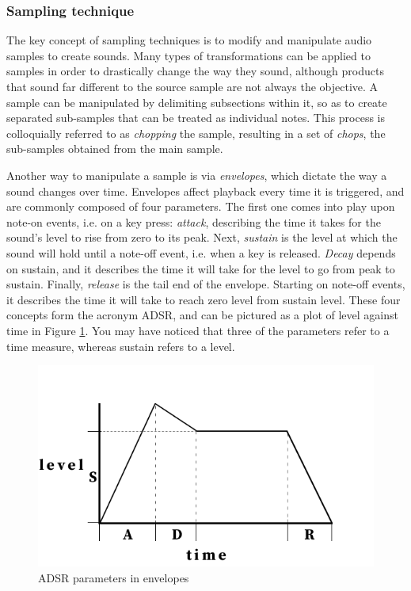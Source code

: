 \documentclass[12pt, a4paper, hidelinks]{article}
\begin{document}
	\subsubsection{Sampling technique}
	The key concept of sampling techniques is to modify and manipulate audio samples to create sounds. Many types of transformations can be applied to samples in order to drastically change the way they sound, although products that sound far different to the source sample are not always the objective. A sample can be manipulated by delimiting subsections within it, so as to create separated sub-samples that can be treated as individual notes. This process is colloquially referred to as \textit{chopping} the sample, resulting in a set of \textit{chops}, the sub-samples obtained from the main sample. \par
	Another way to manipulate a sample is via \textit{envelopes}, which dictate the way a sound changes over time. Envelopes affect playback every time it is triggered, and are commonly composed of four parameters. The first one  comes into play upon note-on events, i.e. on a key press: \textit{attack}, describing the time it takes for the sound's level to rise from zero to its peak. Next, \textit{sustain} is the level at which the sound will hold until a note-off event, i.e. when a key is released. \textit{Decay} depends on sustain, and it describes the time it will take for the level to go from peak to sustain. Finally, \textit{release} is the tail end of the envelope. Starting on note-off events, it describes the time it will take to reach zero level from sustain level. These four concepts form the acronym ADSR, and can be pictured as a plot of level against time in Figure \ref{fig:envelope}. You may have noticed that three of the parameters refer to a time measure, whereas sustain refers to a level. \par
	
	
	\begin{figure}[h]
		\centering
		\includegraphics[scale=0.4]{envelope.png}
		\caption{ADSR parameters in envelopes}
		\label{fig:envelope}
	\end{figure}
	
\end{document}
